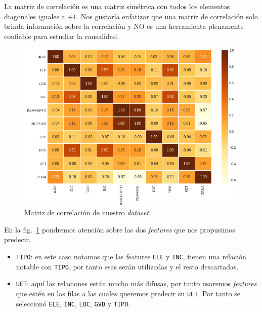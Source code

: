 \documentclass[a4paper,12pt]{article}
\begin{document}
\clearpage				
				
		La matriz de correlación es una matriz simétrica con todos los elementos diagonales iguales a $+1$. Nos gustaría enfatizar que una matriz de correlación solo brinda información sobre la correlación y NO es una herramienta plenamente confiable para estudiar la causalidad. 
				
		\begin{figure}[H]
			\begin{center}
				\includegraphics[width=1\textwidth]{corrmatrix.png}
				\caption{Matriz de correlación de nuestro \textit{dataset}.}
				\label{fig:corrmatrix}
			\end{center}
		\end{figure}
				
		En la fig.~\ref{fig:corrmatrix} pondremos atención sobre las dos \textit{features} que nos propusimos predecir.
				
		\begin{itemize}[noitemsep, topsep=2pt]
			\item \texttt{TIPO}: en este caso notamos que las features \texttt{ELE} y \texttt{INC}, tienen una relación notable con \texttt{TIPO}, por tanto esas serán utilizadas y el resto descartadas.
			\item \texttt{UET}: aquí las relaciones están mucho más difusas, por tanto usaremos \textit{features} que estén en las filas a las cuales queremos predecir su \texttt{UET}. Por tanto se seleccionó \texttt{ELE}, \texttt{INC}, \texttt{LOC}, \texttt{GVD} y \texttt{TIPO}.
		\end{itemize}
		
		\clearpage
				
\end{document}
